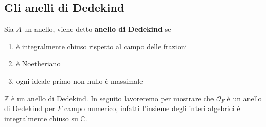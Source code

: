 \subsection{Gli anelli di Dedekind}

\begin{definizione}
	Sia $A$ un anello, viene detto \textbf{anello di Dedekind} se
	\begin{enumerate}
		\item è integralmente chiuso rispetto al campo delle frazioni
		\item è Noetheriano
		\item ogni ideale primo non nullo è massimale
	\end{enumerate}
\end{definizione}

\begin{esempio}
	$\mathbb{Z}$ è un anello di Dedekind. 
	In seguito lavoreremo per mostrare che $\mathcal{O}_F$ è un anello di Dedekind per $F$ campo numerico, infatti l'insieme degli interi algebrici è integralmente chiuso su $\mathbb{C}$.
\end{esempio}


